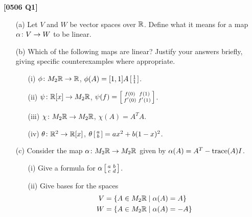 \documentclass[a4paper]{article}
\begin{document}
\begin{problem}\textbf{[0506 Q1]}
 \begin{itemize}
  \item[(a)] Let $V$ and $W$ be vector spaces over ${\mathbb{R}}$.  
   Define what it means for a map $\alpha\colon V\to W$ to be
   linear. 
  \item[(b)] Which of the following maps are linear?
   Justify your answers briefly, giving specific
   counterexamples where appropriate. 
   \begin{itemize}
    \item[(i)] $\phi\colon M_2{\mathbb{R}}\to {\mathbb{R}}$,
     $\phi(A)=[1,1]A\left[\begin{smallmatrix} 1\\1\end{smallmatrix}\right]$.
    \item[(ii)] $\psi\colon{\mathbb{R}}[x]\to M_2{\mathbb{R}}$,
     $\psi(f)=\left[\begin{smallmatrix} f(0) & f(1) \\ f'(0) & f'(1)\end{smallmatrix}\right]$.
    \item[(iii)] $\chi\colon M_2{\mathbb{R}}\to M_2{\mathbb{R}}$,
     $\chi(A)=A^TA$.
    \item[(iv)] $\theta\colon{\mathbb{R}}^2\to{\mathbb{R}}[x]$, 
     $\theta\left[\begin{smallmatrix} a\\ b\end{smallmatrix}\right]=ax^2+b(1-x)^2$.
   \end{itemize}
  \item[(c)] Consider the map $\alpha\colon M_2{\mathbb{R}}\to M_2{\mathbb{R}}$ given by
   $\alpha(A)=A^T-\operatorname{trace}(A)I$.
   \begin{itemize}
    \item[(i)] Give a formula for $\alpha\left[\begin{smallmatrix} a&b\\ c&d\end{smallmatrix}\right]$.
    \item[(ii)] Give bases for the spaces
     \begin{align*}
      V &= \{A\in M_2{\mathbb{R}}\;|\; \alpha(A)=A\} \\
      W &= \{A\in M_2{\mathbb{R}}\;|\; \alpha(A)=-A\} 
     \end{align*}
   \end{itemize}
 \end{itemize}
\end{problem}
\end{document}
